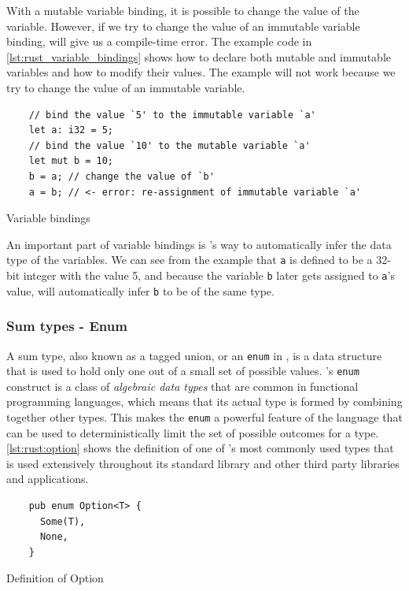 With a mutable variable binding, it is possible to change the value of the variable.
However, if we try to change the value of an immutable variable binding, \rust will give us a compile-time error.
The example code in \autoref{lst:rust_variable_bindings} shows how to declare both mutable and immutable variables and how to modify their values.
The example will not work because we try to change the value of an immutable variable.

\begin{listing}[H]
  \begin{verbatim}
    // bind the value `5' to the immutable variable `a'
    let a: i32 = 5;
    // bind the value `10' to the mutable variable `a'
    let mut b = 10;
    b = a; // change the value of `b'
    a = b; // <- error: re-assignment of immutable variable `a'
  \end{verbatim}
  \caption{Variable bindings}
  \label{lst:rust_variable_bindings}
\end{listing}

An important part of variable bindings is \rust's way to automatically infer the data type of the variables.
We can see from the example that \texttt{a} is defined to be a 32-bit integer with the value 5, and because the variable \texttt{b} later gets assigned to \texttt{a}'s value, \rust will automatically infer \texttt{b} to be of the same type.

\subsubsection{Sum types - Enum}

A sum type, also known as a tagged union, or an \texttt{enum} in \rust, is a data structure that is used to hold only one out of a small set of possible values.
\rust's \texttt{enum} construct is a class of \emph{algebraic data types} that are common in functional programming languages, which means that its actual type is formed by combining together other types.
This makes the \texttt{enum} a powerful feature of the language that can be used to deterministically limit the set of possible outcomes for a type.
\autoref{lst:rust:option} shows the definition of one of \rust's most commonly used types that is used extensively throughout its standard library and other third party libraries and applications.

\begin{listing}[H]
  \begin{verbatim}
    pub enum Option<T> {
      Some(T),
      None,
    }
  \end{verbatim}
  \caption{Definition of Option}
  \label{lst:rust:option}
\end{listing}

